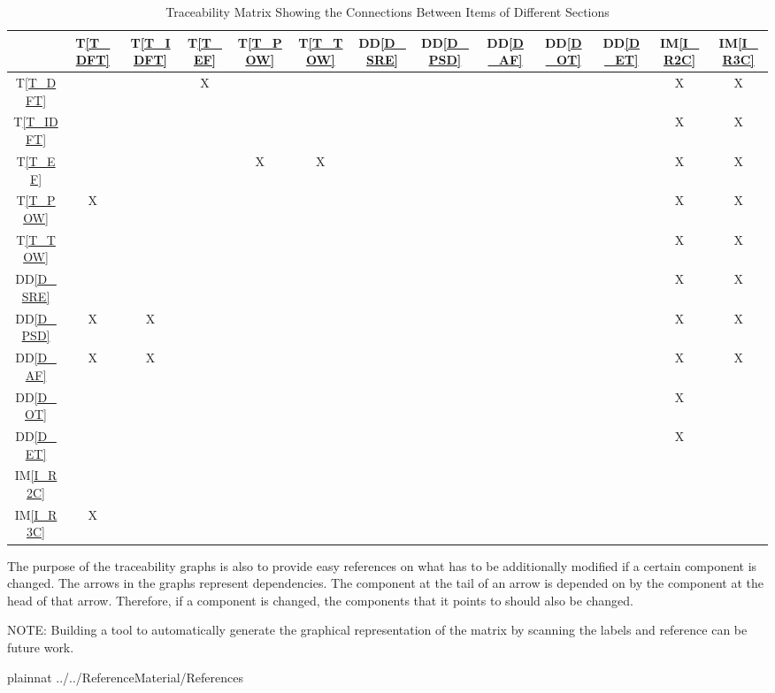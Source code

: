 \documentclass[12pt]{article}
\newcommand{\ddref}[1]{DD\ref{#1}}
\newcommand{\tref}[1]{T\ref{#1}}
\newcommand{\iref}[1]{IM\ref{#1}}
\begin{document}
\begin{table}[h!]
\centering
\begin{tabular}{|c|c|c|c|c|c|c|c|c|c|c|c|c|}
\hline        
	& \tref{T_DFT}& \tref{T_IDFT}& \tref{T_EF}& \tref{T_POW}& \tref{T_TOW}&\ddref{D_SRE}&\ddref{D_PSD} & \ddref{D_AF}&\ddref{D_OT}&\ddref{D_ET}& \iref{I_R2C}& \iref{I_R3C} \\
\hline
\tref{T_DFT}  & & &X & & & & & & & &X &X \\ \hline
\tref{T_IDFT}  & & & & & & & & & & &X & X\\ \hline
\tref{T_EF}   & & & & X&X & & & & & &X &X \\ \hline
\tref{T_POW}  & X& & & & & & & & & &X &X \\ \hline
\tref{T_TOW}  & & & & & & & & & & &X &X \\ \hline
\ddref{D_SRE}  & & & & & & & & & & &X &X \\ \hline
\ddref{D_PSD}  & X&X & & & & & & & & &X & X\\ \hline
\ddref{D_AF}   & X& X& & & & & & & & & X&X \\ \hline
\ddref{D_OT}   & & & & & & & & & & &X& \\ \hline
\ddref{D_ET}    & & & & & & & & & & &X & \\ \hline
\iref{I_R2C}     & & & & & & & & & & & &  \\ \hline
\iref{I_R3C}    & X& & & & & & & & & & & \\ \hline

\end{tabular}
\caption{Traceability Matrix Showing the Connections Between Items of Different Sections}
\label{Table:trace}
\end{table}

The purpose of the traceability graphs is also to provide easy references on what has to be additionally modified if a certain component is changed.  The arrows in the graphs represent dependencies. The component at the tail of an arrow is depended on by the component at the head of that arrow. Therefore, if a component is changed, the components that it points to should also be changed.\par
NOTE: Building a tool to automatically generate the graphical 
representation of the matrix by scanning the labels and reference can be 
future work.


\newpage

 {plainnat}
 {../../ReferenceMaterial/References}
\end{document}

